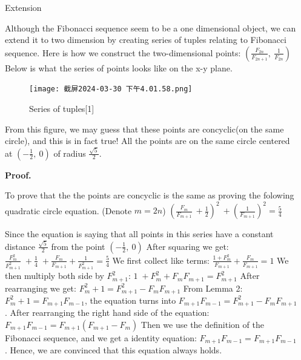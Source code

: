 \documentclass[final]{beamer}
\newlength{\sepwidth}
\newlength{\colwidth}
\newcommand{\separatorcolumn}{\begin{column}{\sepwidth}\end{column}}
\begin{document}
\begin{frame}[t]
\begin{columns}[t]
\separatorcolumn

\begin{column}{\colwidth}

  \begin{block}{Extension}

    Although the Fibonacci sequence seem to be a one dimensional object, we can extend it to two dimension by creating series of tuples relating to Fibonacci sequence.
    Here is how we construct the two-dimensional points:
    $\left( \frac{F_{2n}}{F_{2n+1}}, \: \frac{1}{F_{2n}} \right)$
    \newline
    Below is what the series of points looks like on the x-y plane.
    \begin{figure}
        \centering
        \texttt{[image: 截屏2024-03-30 下午4.01.58.png]}
        \caption{Series of tuples[1]}
        \label{fig:enter-label}
    \end{figure}
    From this figure, we may guess that these points are concyclic(on the same circle), and this is in fact true!
    All the points are on the same circle centered at $\left(-\frac{1}{2}, \: 0 \right)$ of radius $\frac{\sqrt{5}}{2}$.
    
    \newline
    \textbf{Proof.}
    
    \newline
    To prove that  the the points are concyclic is the same as proving the folowing quadratic circle equation. (Denote $m = 2n$)
    \newline
    $(\frac{F_{m}}{F_{m+1}} \: + \frac{1}{2})^{2} \: + (\frac{1}{F_{m+1}})^2 = \frac{5}{4}$
    
    \newline
    Since the equation is saying that all points in this series have a constant distance $\frac{\sqrt{5}}{2}$ from the point $\left(-\frac{1}{2}, \: 0 \right)$
    \newline
    After squaring we get: $\frac{F_{m}^2}{F_{m+1}^2} \; + \frac{1}{4} \; + \frac{F_{m}}{F_{m+1}} + \frac{1}{F_{m+1}^2} = \frac{5}{4}$
    \newline
    We first collect like terms: $\frac{1+F_{m}^2}{F_{m+1}} + \frac{F_{m}}{F_{m+1}} = 1$
    \newline
    We then multiply both side by $F_{m+1}^2$: $1\;+F_{m}^2 + F_{m}F_{m+1} = F_{m+1}^2$
    \newline
    After rearranging we get: $F_{m}^2+1 = F_{m+1}^2 - F_{m}F_{m+1}$
    \newline
    From Lemma 2: $F_{m}^2+1 = F_{m+1}F_{m-1}$, the equation turns into $F_{m+1}F_{m-1} = F_{m+1}^2 - F_{m}F_{m+1}$.
    \newline
    After rearranging the right hand side of the equation:
    $F_{m+1}F_{m-1} = F_{m+1}(F_{m+1} - F_{m})$
    Then we use the definition of the Fibonacci sequence, and we get a identity equation:
    $F_{m+1}F_{m-1} = F_{m+1}F_{m-1}$.
    Hence, we are convinced that this equation always holds.
    

\end{block}
\end{column}
\end{columns}
\end{frame}
\end{document}
